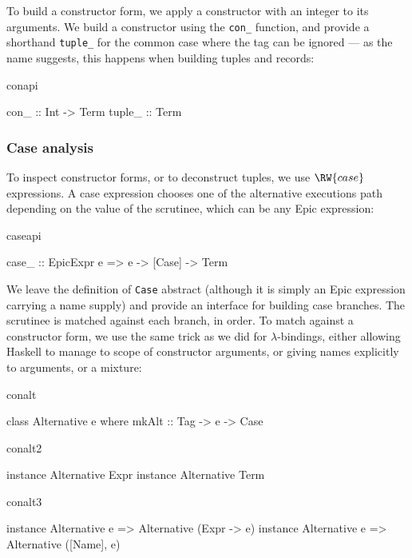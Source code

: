
\noindent
To build a constructor form, we apply a constructor with an integer
 to its arguments. We build a constructor using the
\texttt{con\_} function, and provide a shorthand \texttt{tuple\_} for
the common case where the tag can be ignored --- as the name suggests,
this happens when building tuples and records:

\begin{SaveVerbatim}{conapi}

con_   :: Int -> Term
tuple_ :: Term
\end{SaveVerbatim}

\subsubsection*{Case analysis}

\noindent
To inspect constructor forms, or to deconstruct tuples, we use
$\RW{case}$ expressions. A case expression chooses one of the
alternative executions path depending on the value of the scrutinee,
which can be any Epic expression:

\begin{SaveVerbatim}{caseapi}

case_ :: EpicExpr e => e -> [Case] -> Term

\end{SaveVerbatim}

\noindent
We leave the definition of \texttt{Case} abstract (although it is
simply an Epic expression carrying a name supply) and provide an
interface for building case branches.
The scrutinee is matched against each branch, in order. To match
against a constructor form, we use the same trick as we did for
$\lambda$-bindings, either allowing Haskell to manage to scope of
constructor arguments, or giving names explicitly to arguments, or a
mixture:

\begin{SaveVerbatim}{conalt}

class Alternative e where
    mkAlt :: Tag -> e -> Case
\end{SaveVerbatim}
\begin{SaveVerbatim}{conalt2}

instance Alternative Expr
instance Alternative Term
\end{SaveVerbatim}
\begin{SaveVerbatim}{conalt3}

instance Alternative e => Alternative (Expr -> e)
instance Alternative e => Alternative ([Name], e)

\end{SaveVerbatim}

